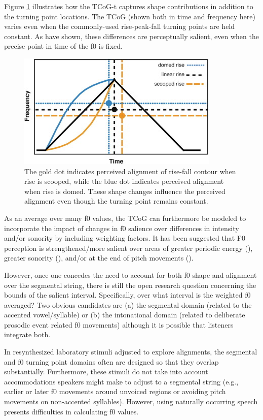 \documentclass[11pt, twoside]{memoir}
\begin{document}
Figure \ref{fig:TCoG} illustrates how the TCoG-t captures shape contributions in addition to the turning point locations. The TCoG (shown both in time and frequency here) varies even when the commonly-used rise-peak-fall turning points are held constant. As \citet{barnes-10a, barnes-12} have shown, these differences are perceptually salient, even when the precise point in time of the f0 is fixed.  

\begin{figure}[H]
\centering
%
\includegraphics[width=.6\linewidth]{Usage-TCoG.png}
%
\caption{The gold dot indicates perceived alignment of rise-fall contour when rise is scooped, while the blue dot indicates perceived alignment when rise is domed. These shape changes influence the perceived alignment even though the turning point remains constant.%
\label{fig:TCoG}%
}
\end{figure}

As an average over many f0 values, the TCoG can furthermore be modeled to incorporate the impact of changes in f0 salience over differences in intensity and/or sonority by including weighting factors.  It has been suggested that F0 perception is strengthened\slash more salient over areas of greater periodic energy (\citealt{albert-18}), greater sonority (\citealt{barnes-14}), and/or at the end of  pitch movements (\citealt{dalessandro-95}). 

However, once one concedes the need to account for both f0 shape and alignment over the segmental string, there is  still the open research question concerning the bounds of the salient interval. Specifically, over what interval is the weighted f0 averaged?  Two obvious candidates are (a) the segmental domain (related to the accented vowel\slash syllable) or (b) the intonational domain (related to deliberate prosodic event related f0 movements) although it is possible that listeners integrate both.

In resynthesized laboratory stimuli adjusted to explore alignments, the segmental and f0 turning point domains often are designed so that they overlap substantially.  Furthermore, these stimuli do not take into account accommodations speakers might make to adjust to a segmental string (e.g., earlier or later f0 movements around unvoiced regions or avoiding pitch movements on non-accented syllables). However, using naturally occurring speech presents difficulties in calculating f0 values.
\end{document}
